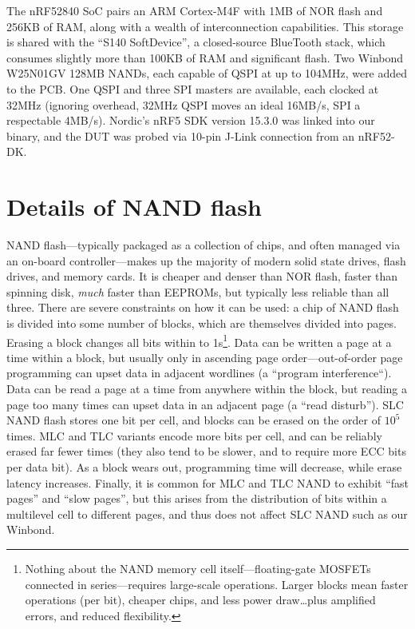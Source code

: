 \documentclass[letterpaper,10pt]{article}
\begin{document}
The nRF52840\parencite{nrf52840} SoC pairs an ARM Cortex-M4F with 1MB of
NOR flash and 256KB of RAM, along with a wealth of interconnection
capabilities. This storage is shared with the ``S140
SoftDevice''\parencite{s140}, a closed-source BlueTooth stack, which consumes
slightly more than 100KB of RAM and significant flash.
Two Winbond W25N01GV\parencite{winbond}
128MB NANDs, each capable of QSPI at up to 104MHz, were added to the PCB.
One QSPI and three SPI masters are available, each clocked at 32MHz (ignoring
overhead, 32MHz QSPI moves an ideal 16MB/s, SPI a respectable 4MB/s). Nordic's nRF5 SDK\parencite{nrf52sdk}
version 15.3.0 was linked into our binary, and the DUT was probed via 10-pin
J-Link\parencite{segger} connection from an nRF52-DK\parencite{nrf52dk}.

\section{Details of NAND flash}

NAND flash---typically packaged as a collection of chips, and often managed via
an on-board controller---makes up the majority of modern solid state drives,
flash drives, and memory cards. It is cheaper and denser than NOR flash,
faster than spinning disk, \textit{much} faster than EEPROMs, but typically
less reliable than all three. There are severe constraints on how it can be
used: a chip of NAND flash is divided into some number of blocks, which are
themselves divided into pages. Erasing a block changes all bits within to
1s\footnote{Nothing about the NAND memory cell itself---floating-gate MOSFETs
connected in series---requires large-scale operations. Larger blocks mean
faster operations (per bit), cheaper chips, and less power draw\ldots plus
amplified errors, and reduced flexibility.}. Data can be written a page at a
time within a block, but usually only in ascending page order---out-of-order
page programming can upset data in adjacent wordlines (a ``program
interference``)\parencite{interference}. Data can be read a page at a time from
anywhere within the block, but reading a page too many times can upset data in
an adjacent page (a ``read disturb''). SLC NAND flash stores one bit per cell,
and blocks can be erased on the order of $10^5$ times. MLC and TLC variants
encode more bits per cell, and can be reliably erased far fewer times (they
also tend to be slower, and to require more ECC bits per data bit). As a block
wears out, programming time will decrease, while erase latency
increases\parencite{needtoknow}. Finally, it is common for MLC and TLC NAND to
exhibit ``fast pages'' and ``slow pages'', but this arises from the
distribution of bits within a multilevel cell to different pages, and thus does
not affect SLC NAND\parencite{anomalies} such as our Winbond.
\end{document}

